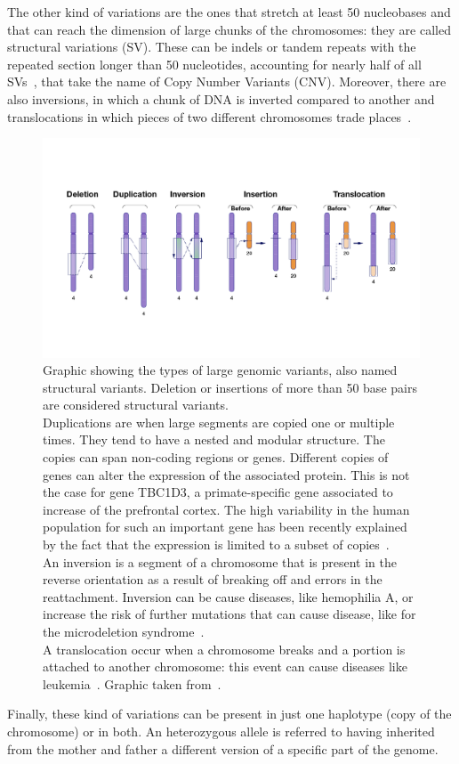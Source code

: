 The other kind of variations are the ones that stretch at least 50 nucleobases and that can reach the dimension of large chunks of the chromosomes: they are called structural variations (\gls{SV}).
These can be indels or tandem repeats with the repeated section longer than 50 nucleotides, accounting for nearly half of all SVs~\cite{nih_variation}, that take the name of Copy Number Variants (\gls{CNV}). Moreover, there are also inversions, in which a chunk of DNA is inverted compared to another and translocations in which pieces of two different chromosomes trade places~\cite{nih_variation}.\\
\begin{figure}[H]
	\centering
	\includegraphics[width=\linewidth]{figures/background/large_variants.png}
	\caption[Large genomic variants.]{Graphic showing the types of large genomic variants, also named structural variants. Deletion or insertions of more than 50 base pairs are considered structural variants.\\ Duplications are when large segments are copied one or multiple times. They tend to have a nested and modular structure. The copies can span non-coding regions or genes. Different copies of genes can alter the expression of the associated protein. This is not the case for gene TBC1D3, a primate-specific gene associated to increase of the prefrontal cortex. The high variability in the human population for such an important gene has been recently explained by the fact that the expression is limited to a subset of copies~\cite{tbc1d3}.\\  An inversion is a segment of a chromosome that is present in the reverse orientation as a result of breaking off and errors in the reattachment. Inversion can be cause diseases, like hemophilia A, or increase the risk of further mutations that can cause disease, like for the microdeletion syndrome~\cite{inversions_disease}.\\ A translocation occur when a chromosome breaks and a portion is attached to another chromosome: this event can cause diseases like leukemia~\cite{leukemia}.  Graphic taken from~\cite{nih_variation}. }
	\label{fig:large_variants}
\end{figure}
Finally, these kind of variations can be present in just one haplotype (copy of the chromosome) or in both. An heterozygous allele is referred to having inherited from the mother and father a different version of a specific part of the genome.

